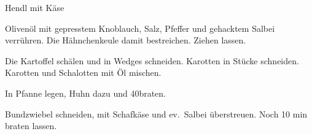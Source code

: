 \begin{recipe}{Hendl mit Käse}

    \begin{ingredients}
    \end{ingredients}

    \begin{instructions}
        Olivenöl mit gepresstem Knoblauch, Salz, Pfeffer und gehacktem Salbei verrühren.
        Die Hähnchenkeule damit bestreichen. Ziehen lassen.

        Die Kartoffel schälen und in Wedges schneiden.
        Karotten in Stücke schneiden.
        Karotten und Schalotten mit Öl mischen.
    
        In Pfanne legen, Huhn dazu und 40\minutes braten.

        Bundzwiebel schneiden, mit Schafkäse und ev.\ Salbei überstreuen.
        Noch 10 min braten lassen.
    \end{instructions}
\end{recipe}
